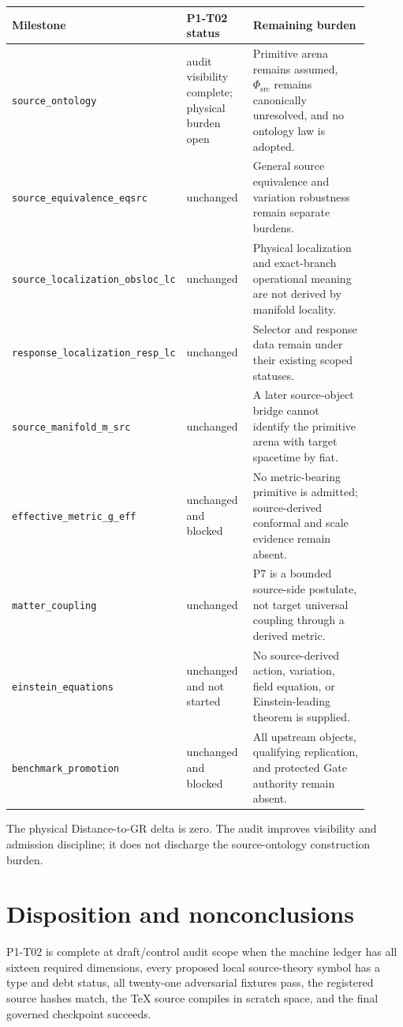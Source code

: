 \documentclass[11pt]{article}
\newcommand{\PhiSrc}{\Phi_{\mathrm{src}}}
\begin{document}
\small
\begin{longtable}{@{}p{0.21\linewidth}p{0.20\linewidth}p{0.49\linewidth}@{}}
\toprule
Milestone & P1-T02 status & Remaining burden \\
\midrule
\endhead
\texttt{source\_ontology} & audit visibility complete; physical burden open & Primitive arena remains assumed, \(\PhiSrc\) remains canonically unresolved, and no ontology law is adopted.\\
\texttt{source\_equivalence\_eqsrc} & unchanged & General source equivalence and variation robustness remain separate burdens.\\
\texttt{source\_localization\_obsloc\_lc} & unchanged & Physical localization and exact-branch operational meaning are not derived by manifold locality.\\
\texttt{response\_localization\_resp\_lc} & unchanged & Selector and response data remain under their existing scoped statuses.\\
\texttt{source\_manifold\_m\_src} & unchanged & A later source-object bridge cannot identify the primitive arena with target spacetime by fiat.\\
\texttt{effective\_metric\_g\_eff} & unchanged and blocked & No metric-bearing primitive is admitted; source-derived conformal and scale evidence remain absent.\\
\texttt{matter\_coupling} & unchanged & P7 is a bounded source-side postulate, not target universal coupling through a derived metric.\\
\texttt{einstein\_equations} & unchanged and not started & No source-derived action, variation, field equation, or Einstein-leading theorem is supplied.\\
\texttt{benchmark\_promotion} & unchanged and blocked & All upstream objects, qualifying replication, and protected Gate authority remain absent.\\
\bottomrule
\end{longtable}
\normalsize

The physical Distance-to-GR delta is zero. The audit improves visibility and
admission discipline; it does not discharge the source-ontology construction
burden.

\section{Disposition and nonconclusions}

P1-T02 is complete at draft/control audit scope when the machine ledger has all
sixteen required dimensions, every proposed local source-theory symbol has a
type and debt status, all twenty-one adversarial fixtures pass, the registered
source hashes match, the TeX source compiles in scratch space, and the final
governed checkpoint succeeds.
\end{document}
